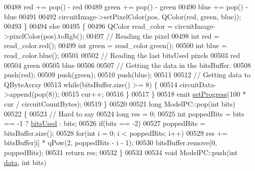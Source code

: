 \begin{DoxyCode}
00488         red += pop() - red %
00489         green += pop() - green %
00490         blue += pop() - blue %
00491 
00492         circuitImage->setPixelColor(pos, QColor(red, green, blue));
00493     \}
00494     \textcolor{keywordflow}{else}
00495     \{
00496         QColor read\_color = circuitImage->pixelColor(pos).toRgb();
00497         \textcolor{comment}{// Reading the pixel}
00498         \textcolor{keywordtype}{int} red = read\_color.red();
00499         \textcolor{keywordtype}{int} green = read\_color.green();
00500         \textcolor{keywordtype}{int} blue = read\_color.blue();
00501 
00502         \textcolor{comment}{// Reading the last bitsUsed pixels}
00503         red %
00504         green %
00505         blue %
00506 
00507         \textcolor{comment}{// Getting the data in the bitsBuffer.}
00508         push(red);
00509         push(green);
00510         push(blue);
00511 
00512         \textcolor{comment}{// Getting data to QByteArray}
00513         \textcolor{keywordflow}{while}(bitsBuffer.size() >= 8) \{
00514             circuitData->append(pop(8));
00515             cur++;
00516         \}
00517     \}
00518     emit \hyperlink{class_model_p_c_afdcd80f0ed5062e145a71f09b0897547}{setProgress}(100 * cur / circuitCountBytes);
00519 \}
00520 
00521 \textcolor{keywordtype}{long} ModelPC::pop(\textcolor{keywordtype}{int} bits)
00522 \{
00523     \textcolor{comment}{// Hard to say}
00524     \textcolor{keywordtype}{long} res = 0;
00525     \textcolor{keywordtype}{int} poppedBits = bits == -1 ? \hyperlink{class_model_p_c_a655deb6a8afa94c7f4aadb3056989038}{bitsUsed} : bits;
00526     \textcolor{keywordflow}{if}(bits == -2)
00527         poppedBits = bitsBuffer.size();
00528     \textcolor{keywordflow}{for}(\textcolor{keywordtype}{int} i = 0; i < poppedBits; i++)
00529         res += bitsBuffer[i] * qPow(2, poppedBits - i - 1);
00530     bitsBuffer.remove(0, poppedBits);
00531     \textcolor{keywordflow}{return} res;
00532 \}
00533 
00534 \textcolor{keywordtype}{void} ModelPC::push(\textcolor{keywordtype}{int} \hyperlink{namespace_errors_dict_setup_adf4c30d205d29df7343e26f7c62b0685}{data}, \textcolor{keywordtype}{int} bits)

\end{DoxyCode}
